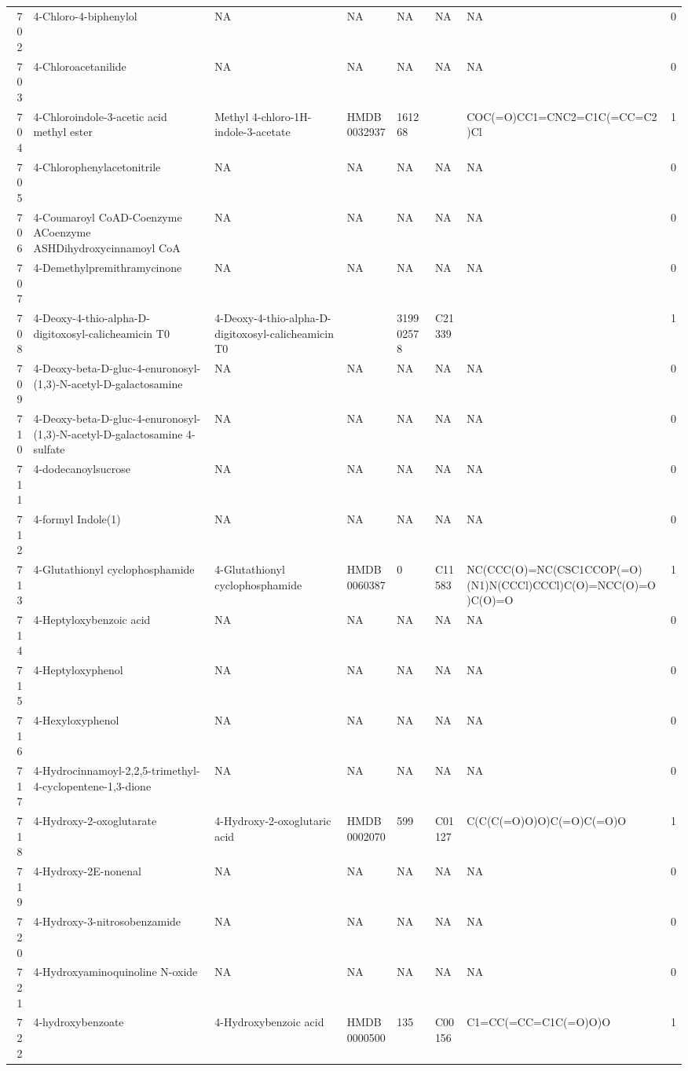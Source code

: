 \documentclass[a4paper]{article}
\begin{document}
\begin{longtable}{rlllllll}
  702 & 4-Chloro-4-biphenylol & NA & NA & NA & NA & NA & 0 \\ 
  703 & 4-Chloroacetanilide & NA & NA & NA & NA & NA & 0 \\ 
  704 & 4-Chloroindole-3-acetic acid methyl ester & Methyl 4-chloro-1H-indole-3-acetate & HMDB0032937 & 161268 &  & COC(=O)CC1=CNC2=C1C(=CC=C2)Cl & 1 \\ 
  705 & 4-Chlorophenylacetonitrile & NA & NA & NA & NA & NA & 0 \\ 
  706 & 4-Coumaroyl CoAD-Coenzyme ACoenzyme ASHDihydroxycinnamoyl CoA & NA & NA & NA & NA & NA & 0 \\ 
  707 & 4-Demethylpremithramycinone & NA & NA & NA & NA & NA & 0 \\ 
  708 & 4-Deoxy-4-thio-alpha-D-digitoxosyl-calicheamicin T0 & 4-Deoxy-4-thio-alpha-D-digitoxosyl-calicheamicin T0 &  & 319902578 & C21339 &  & 1 \\ 
  709 & 4-Deoxy-beta-D-gluc-4-enuronosyl-(1,3)-N-acetyl-D-galactosamine & NA & NA & NA & NA & NA & 0 \\ 
  710 & 4-Deoxy-beta-D-gluc-4-enuronosyl-(1,3)-N-acetyl-D-galactosamine 4-sulfate & NA & NA & NA & NA & NA & 0 \\ 
  711 & 4-dodecanoylsucrose & NA & NA & NA & NA & NA & 0 \\ 
  712 & 4-formyl Indole(1) & NA & NA & NA & NA & NA & 0 \\ 
  713 & 4-Glutathionyl cyclophosphamide & 4-Glutathionyl cyclophosphamide & HMDB0060387 & 0 & C11583 & NC(CCC(O)=NC(CSC1CCOP(=O)(N1)N(CCCl)CCCl)C(O)=NCC(O)=O)C(O)=O & 1 \\ 
  714 & 4-Heptyloxybenzoic acid & NA & NA & NA & NA & NA & 0 \\ 
  715 & 4-Heptyloxyphenol & NA & NA & NA & NA & NA & 0 \\ 
  716 & 4-Hexyloxyphenol & NA & NA & NA & NA & NA & 0 \\ 
  717 & 4-Hydrocinnamoyl-2,2,5-trimethyl-4-cyclopentene-1,3-dione & NA & NA & NA & NA & NA & 0 \\ 
  718 & 4-Hydroxy-2-oxoglutarate & 4-Hydroxy-2-oxoglutaric acid & HMDB0002070 & 599 & C01127 & C(C(C(=O)O)O)C(=O)C(=O)O & 1 \\ 
  719 & 4-Hydroxy-2E-nonenal & NA & NA & NA & NA & NA & 0 \\ 
  720 & 4-Hydroxy-3-nitrosobenzamide & NA & NA & NA & NA & NA & 0 \\ 
  721 & 4-Hydroxyaminoquinoline N-oxide & NA & NA & NA & NA & NA & 0 \\ 
  722 & 4-hydroxybenzoate & 4-Hydroxybenzoic acid & HMDB0000500 & 135 & C00156 & C1=CC(=CC=C1C(=O)O)O & 1 \\ 

\end{longtable}
\end{document}
